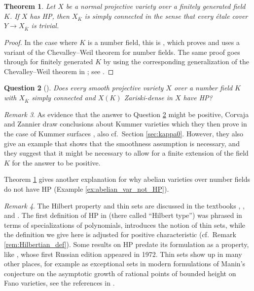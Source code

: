 \documentclass[10pt,a4paper]{amsart}
\theoremstyle{plain}
\newtheorem{theorem}{Theorem}
\newtheorem{question}[theorem]{Question}
\theoremstyle{remark}
\newtheorem{remark}[theorem]{Remark}
\numberwithin{theorem}{section}
\begin{document}
\begin{theorem}\label{thm:CZ}
Let $X$ be a normal projective variety over a finitely generated field $K$.
If $X$ has HP, then $X_{\overline{K}}$ is simply connected in the sense that every   \'etale cover $Y\rightarrow X_{\overline{K}}$ is trivial.  
\end{theorem}

\begin{proof}
In the case where $K$ is a number field,
this is \cite[Theorem 1.4]{CZ}, which proves and uses a variant of the Chevalley--Weil theorem for number fields.
The same proof goes through for finitely generated $K$
by using the corresponding generalization of the Chevalley--Weil theorem in \cite[Theorem 3.8]{CDJLZ}; see \cite[Theorem~3.2]{Luger}.
\end{proof}

\begin{question}[{\cite[Question-Conjecture 1]{CZ}}]\label{conj:CZ1}
Does every
smooth projective variety $X$ over a number field $K$
with $X_{\overline{K}}$ simply connected
and $X(K)$ Zariski-dense in $X$ have HP?
\end{question}

\begin{remark}\label{rem:smooth_necessary}
As evidence that the answer to Question \ref{conj:CZ1} might be positive, Corvaja and Zannier draw conclusions about Kummer varieties \cite[p.~589]{CZ} which they then prove in the case of Kummer surfaces \cite[Appendix]{CZ},
also cf.~Section \ref{sec:kappa0}.
However, they also give an example \cite[Theorem 1.5]{CZ} that shows that the smoothness assumption is necessary,
and they suggest that it might be necessary to
allow for a finite extension of the field $K$ for the answer to be positive. 
\end{remark}

Theorem \ref{thm:CZ} gives another explanation for why
abelian varieties over number fields do not have HP (Example \ref{ex:abelian_var_not_HP}).

\begin{remark}\label{rem:HP}
The Hilbert property and thin sets are discussed in the textbooks
\cite[Chapter 3]{Serre},
\cite[Chapter 9]{Serre_MW}, and
\cite[Chapter 13.5]{FJ}.
The first definition of HP in \cite[p.~189]{CTS} (there called ``Hilbert type'') was phrased in terms of specializations of polynomials,
\cite{Serre} introduces the notion of thin sets,
while the definition we give here is adjusted for positive characteristic (cf.~Remark \ref{rem:Hilbertian_def}).
Some results on HP predate its formulation as a property, like \cite[Theorem 46.1]{Manin}, whose first Russian edition appeared in 1972.
Thin sets show up in many other places,
for example as exceptional sets in modern formulations of Manin's conjecture on the asymptotic growth of rational points of bounded height on Fano varieties, see the references in \cite{BL,LST}.
\end{remark}
\end{document}

